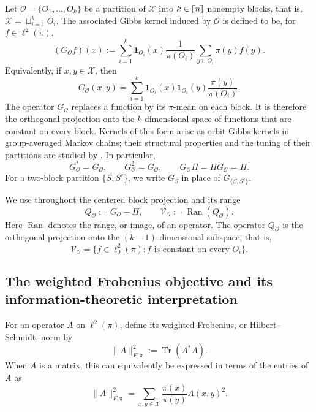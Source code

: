 \documentclass[11pt]{article}
\newcommand{\1}{\mathbf{1}}
\newcommand{\X}{\mathcal{X}}
\providecommand{\llbracket}{\mathopen{[\mkern-2.7mu[}}
\providecommand{\rrbracket}{\mathclose{]\mkern-2.7mu]}}
\begin{document}
Let
$
    \mathcal{O}=\{O_1,\ldots,O_k\}
$
be a partition of $\X$ into $k \in \llbracket n \rrbracket$ nonempty blocks, that is, $\mathcal{X} = \sqcup_{i=1}^k O_i$.  The associated Gibbs kernel induced by $\mathcal{O}$ is defined to be, for $f \in \ell^2(\pi)$,
\begin{equation*}
    (G_{\mathcal O}f)(x)
    :=\sum_{i=1}^k \1_{O_i}(x)
      \frac{1}{\pi(O_i)}
      \sum_{y\in O_i}\pi(y)f(y).
\end{equation*}
Equivalently, if $x,y\in\X$, then
\[
    G_{\mathcal O}(x,y)
    =\sum_{i=1}^k
      \1_{O_i}(x)\1_{O_i}(y)\frac{\pi(y)}{\pi(O_i)}.
\]
The operator $G_{\mathcal O}$ replaces a function by its $\pi$-mean
on each block.  It is therefore the orthogonal projection onto the
$k$-dimensional space of functions that are constant on every block.
Kernels of this form arise as orbit Gibbs kernels in group-averaged
Markov chains; their structural properties and the tuning of their
partitions are studied by
\citet{ChoiLimWang2025GroupAveragedII,LimChoi2026TwoBlock,LimChoi2026Additive}.
In particular,
\[
    G_{\mathcal O}^*=G_{\mathcal O},
    \qquad
    G_{\mathcal O}^2=G_{\mathcal O},
    \qquad
    G_{\mathcal O}\Pi=\Pi G_{\mathcal O}=\Pi.
\]
For a two-block partition $\{S,S^c\}$, we write $G_S$ in place of
$G_{\{S,S^c\}}$.

We use throughout the centered block projection and its range
\begin{equation}
    Q_{\mathcal O}:=G_{\mathcal O}-\Pi,
    \qquad
    \mathcal V_{\mathcal O}:=\operatorname{Ran}(Q_{\mathcal O}).
    \label{eq:QO-VO}
\end{equation}
Here $\operatorname{Ran}$ denotes the range, or image, of an operator.
The operator $Q_{\mathcal O}$ is the orthogonal projection onto the
$(k-1)$-dimensional subspace, that is, 
\[
    \mathcal V_{\mathcal O}
    =
    \{f\in\ell^2_0(\pi):
      f\text{ is constant on every }O_i\}.
\]

\subsection{The weighted Frobenius objective and its information-theoretic interpretation}

For an operator $A$ on $\ell^2(\pi)$, define its weighted Frobenius, or
Hilbert--Schmidt, norm by
\[
    \|A\|_{F,\pi}^2:=\operatorname{Tr}(A^*A).
\]
When $A$ is a matrix, this can equivalently be expressed in terms of the entries of $A$ as
\[
    \|A\|_{F,\pi}^2
    =\sum_{x,y\in\X}
      \frac{\pi(x)}{\pi(y)}A(x,y)^2.
\]
\end{document}
